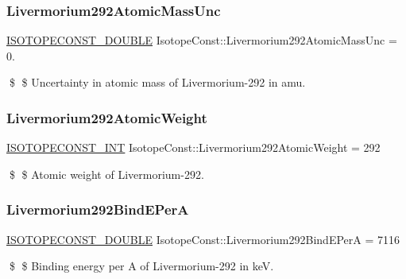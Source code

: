 \subsubsection{\texorpdfstring{Livermorium292\+Atomic\+Mass\+Unc}{Livermorium292AtomicMassUnc}}
{\footnotesize\ttfamily \mbox{\hyperlink{group___isotope_const-_macros_ga8f45a7272ce02c0b4c65c44636ed719a}{I\+S\+O\+T\+O\+P\+E\+C\+O\+N\+S\+T\+\_\+\+D\+O\+U\+B\+LE}} Isotope\+Const\+::\+Livermorium292\+Atomic\+Mass\+Unc = 0.}

\$ \$ Uncertainty in atomic mass of Livermorium-\/292 in amu. \mbox{\label{group___isotope_const-_livermorium-_lv292_gad8e15296dd0305aaafa37f8c9658aad8}} 
\subsubsection{\texorpdfstring{Livermorium292\+Atomic\+Weight}{Livermorium292AtomicWeight}}
{\footnotesize\ttfamily \mbox{\hyperlink{group___isotope_const-_macros_ga5f18360b3e99483a35c32d789e62621c}{I\+S\+O\+T\+O\+P\+E\+C\+O\+N\+S\+T\+\_\+\+I\+NT}} Isotope\+Const\+::\+Livermorium292\+Atomic\+Weight = 292}

\$ \$ Atomic weight of Livermorium-\/292. \mbox{\label{group___isotope_const-_livermorium-_lv292_ga8287af3d4d3f995434668c59aed84e2b}} 
\subsubsection{\texorpdfstring{Livermorium292\+Bind\+E\+PerA}{Livermorium292BindEPerA}}
{\footnotesize\ttfamily \mbox{\hyperlink{group___isotope_const-_macros_ga8f45a7272ce02c0b4c65c44636ed719a}{I\+S\+O\+T\+O\+P\+E\+C\+O\+N\+S\+T\+\_\+\+D\+O\+U\+B\+LE}} Isotope\+Const\+::\+Livermorium292\+Bind\+E\+PerA = 7116}

\$ \$ Binding energy per A of Livermorium-\/292 in keV. \mbox{\label{group___isotope_const-_livermorium-_lv292_gac74f3e8818206f3324a5f35e4f774be3}} 
